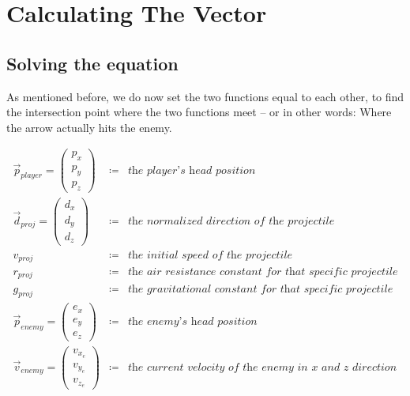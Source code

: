 \section{Calculating The Vector}

\subsection{Solving the equation}

As mentioned before, we do now set the two functions equal to each other, to find the intersection point where the two functions meet – or in other words: Where the arrow actually hits the enemy.

\begin{eqnarray*}
        \overrightarrow{p}_{player} = {\begin{pmatrix} p_x \\ p_y \\ p_z \end{pmatrix}} & \coloneqq & \textit{the player's head position} \\
        \overrightarrow{d}_{proj} = {\begin{pmatrix} d_x \\ d_y \\ d_z \end{pmatrix}} & \coloneqq & \textit{the normalized direction of the projectile} \\
        v_{proj} & \coloneqq & \textit{the initial speed of the projectile} \\
        r_{proj} & \coloneqq & \textit{the air resistance constant for that specific projectile} \\
        g_{proj} & \coloneqq & \textit{the gravitational constant for that specific projectile} \\
        \overrightarrow{p}_{enemy} = {\begin{pmatrix} e_x \\ e_y \\ e_z \end{pmatrix}} & \coloneqq & \textit{the enemy's head position} \\
        \overrightarrow{v}_{enemy} = {\begin{pmatrix} v_{x_e} \\ v_{y_e} \\ v_{z_e} \end{pmatrix}} & \coloneqq & \textit{the current velocity of the enemy in x and z direction} \\
\end{eqnarray*}

